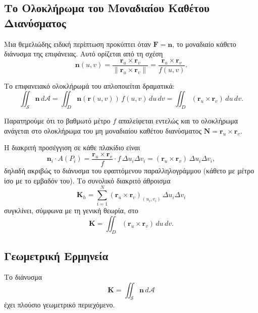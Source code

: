 \documentclass[10pt,a4paper,twoside,openany]{book}
\theoremstyle{plain}
\theoremstyle{definition}
\theoremstyle{remark}
\numberwithin{equation}{section}
\begin{document}
\subsection{Το Ολοκλήρωμα του Μοναδιαίου Καθέτου Διανύσματος}

Μια θεμελιώδης ειδική περίπτωση προκύπτει όταν \(\mathbf{F} = \mathbf{n}\), το μοναδιαίο κάθετο διάνυσμα της επιφάνειας. Αυτό ορίζεται από τη σχέση
\[
\mathbf{n}(u,v) = \frac{\mathbf{r}_u \times \mathbf{r}_v}{\|\mathbf{r}_u \times \mathbf{r}_v\|} = \frac{\mathbf{r}_u \times \mathbf{r}_v}{f(u,v)}.
\]

Το επιφανειακό ολοκλήρωμά του απλοποιείται δραματικά:
\[
\iint_{\mathcal{S}} \mathbf{n} \, d\mathcal{A} = \iint_D \mathbf{n}(\mathbf{r}(u,v)) \, f(u,v) \, du \, dv = \iint_D (\mathbf{r}_u \times \mathbf{r}_v) \, du \, dv.
\]

Παρατηρούμε ότι το βαθμωτό μέτρο \(f\) απαλείφεται εντελώς και το ολοκλήρωμα ανάγεται στο ολοκλήρωμα του μη μοναδιαίου καθέτου διανύσματος \(\mathbf{N} = \mathbf{r}_u \times \mathbf{r}_v\).

Η διακριτή προσέγγιση σε κάθε πλακίδιο είναι
\[
\mathbf{n}_i \cdot A(P_i) = \frac{\mathbf{r}_u \times \mathbf{r}_v}{f} \cdot f \, \Delta u_i \Delta v_i = (\mathbf{r}_u \times \mathbf{r}_v) \, \Delta u_i \Delta v_i,
\]
δηλαδή ακριβώς το διάνυσμα του εφαπτόμενου παραλληλογράμμου (κάθετο με μέτρο ίσο με το εμβαδόν του). Το συνολικό διακριτό άθροισμα
\[
\mathbf{K}_h = \sum_{i=1}^N (\mathbf{r}_u \times \mathbf{r}_v)_{(u_i, v_i)} \, \Delta u_i \Delta v_i
\]
συγκλίνει, σύμφωνα με τη γενική θεωρία, στο
\[
\mathbf{K} = \iint_D (\mathbf{r}_u \times \mathbf{r}_v) \, du \, dv.
\]

\subsection{Γεωμετρική Ερμηνεία}

Το διάνυσμα
\[
\mathbf{K} = \iint_{\mathcal{S}} \mathbf{n} \, d\mathcal{A}
\]
έχει πλούσιο γεωμετρικό περιεχόμενο.
\end{document}

